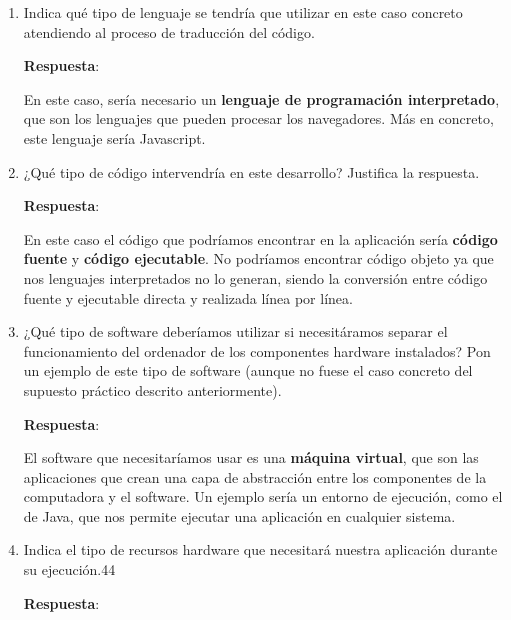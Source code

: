 \begin{enumerate}
    \item Indica qué tipo de lenguaje se tendría que utilizar en este caso concreto atendiendo al proceso de traducción del código.

    \textbf{Respuesta}:

     En este caso, sería necesario un \textbf{lenguaje de programación interpretado}, que son los lenguajes que pueden procesar los navegadores. Más en concreto, este lenguaje sería Javascript.

    \item ¿Qué tipo de código intervendría en este desarrollo? Justifica la respuesta.

    \textbf{Respuesta}:

    En este caso el código que podríamos encontrar en la aplicación sería \textbf{código fuente} y \textbf{código ejecutable}. No podríamos encontrar código objeto ya que nos lenguajes interpretados no lo generan, siendo la conversión entre código fuente y ejecutable directa y realizada línea por línea.

    \item ¿Qué tipo de software deberíamos utilizar si necesitáramos separar el funcionamiento del ordenador de los componentes hardware instalados? Pon un ejemplo de este tipo de software (aunque no fuese el caso concreto del supuesto práctico descrito anteriormente).

    \textbf{Respuesta}:

    El software que necesitaríamos usar es una \textbf{máquina virtual}, que son las aplicaciones que crean una capa de abstracción entre los componentes de la computadora y el software. Un ejemplo sería un entorno de ejecución, como el de Java, que nos permite ejecutar una aplicación en cualquier sistema.

    \item Indica el tipo de recursos hardware que necesitará nuestra aplicación durante su ejecución.44

    \textbf{Respuesta}:


\end{enumerate}
